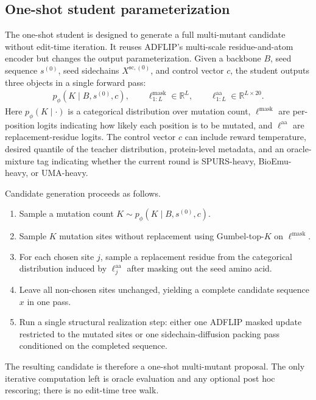\documentclass[11pt]{article}
\newcommand{\RR}{\mathbb{R}}
\begin{document}
\subsection{One-shot student parameterization}

The one-shot student is designed to generate a full multi-mutant candidate without edit-time iteration. It reuses ADFLIP's multi-scale residue-and-atom encoder but changes the output parameterization. Given a backbone $B$, seed sequence $s^{(0)}$, seed sidechains $X^{\mathrm{sc},(0)}$, and control vector $c$, the student outputs three objects in a single forward pass:
\begin{align}
    p_{\phi}(K\mid B,s^{(0)},c),\qquad
    \ell^{\mathrm{mask}}_{1:L}\in\RR^L,\qquad
    \ell^{\mathrm{aa}}_{1:L}\in\RR^{L\times 20}.
\end{align}
Here $p_{\phi}(K\mid\cdot)$ is a categorical distribution over mutation count, $\ell^{\mathrm{mask}}$ are per-position logits indicating how likely each position is to be mutated, and $\ell^{\mathrm{aa}}$ are replacement-residue logits. The control vector $c$ can include reward temperature, desired quantile of the teacher distribution, protein-level metadata, and an oracle-mixture tag indicating whether the current round is SPURS-heavy, BioEmu-heavy, or UMA-heavy.

Candidate generation proceeds as follows.
\begin{enumerate}[leftmargin=1.5em]
    \item Sample a mutation count $K\sim p_{\phi}(K\mid B,s^{(0)},c)$.
    \item Sample $K$ mutation sites without replacement using Gumbel-top-$K$ on $\ell^{\mathrm{mask}}$.
    \item For each chosen site $j$, sample a replacement residue from the categorical distribution induced by $\ell^{\mathrm{aa}}_j$ after masking out the seed amino acid.
    \item Leave all non-chosen sites unchanged, yielding a complete candidate sequence $x$ in one pass.
    \item Run a single structural realization step: either one ADFLIP masked update restricted to the mutated sites or one sidechain-diffusion packing pass conditioned on the completed sequence.
\end{enumerate}
The resulting candidate is therefore a one-shot multi-mutant proposal. The only iterative computation left is oracle evaluation and any optional post hoc rescoring; there is no edit-time tree walk.
\end{document}
